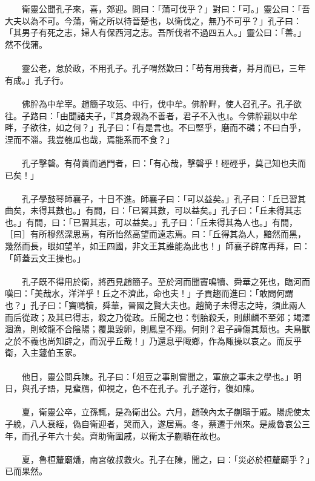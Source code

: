 \\\\
　　衛靈公聞孔子來，喜，郊迎。問曰：「蒲可伐乎？」對曰：「可。」靈公曰：「吾大夫以為不可。今蒲，衛之所以待晉楚也，以衛伐之，無乃不可乎？」孔子曰：「其男子有死之志，婦人有保西河之志。吾所伐者不過四五人。」靈公曰：「善。」然不伐蒲。
\\\\
　　靈公老，怠於政，不用孔子。孔子喟然歎曰：「苟有用我者，朞月而已，三年有成。」孔子行。
\\\\
　　佛肸為中牟宰。趙簡子攻范、中行，伐中牟。佛肸畔，使人召孔子。孔子欲往。子路曰：「由聞諸夫子，『其身親為不善者，君子不入也』。今佛肸親以中牟畔，子欲往，如之何？」孔子曰：「有是言也。不曰堅乎，磨而不磷；不曰白乎，涅而不淄。我豈匏瓜也哉，焉能系而不食？」
\\\\
　　孔子擊磬。有荷蕢而過門者，曰：「有心哉，擊磬乎！硜硜乎，莫己知也夫而已矣！」
\\\\
　　孔子學鼓琴師襄子，十日不進。師襄子曰：「可以益矣。」孔子曰：「丘已習其曲矣，未得其數也。」有間，曰：「已習其數，可以益矣。」孔子曰：「丘未得其志也。」有間，曰：「已習其志，可以益矣。」孔子曰：「丘未得其為人也。」有間，［曰］有所穆然深思焉，有所怡然高望而遠志焉。曰：「丘得其為人，黯然而黑，幾然而長，眼如望羊，如王四國，非文王其誰能為此也！」師襄子辟席再拜，曰：「師蓋云文王操也。」
\\\\
　　孔子既不得用於衛，將西見趙簡子。至於河而聞竇鳴犢、舜華之死也，臨河而嘆曰：「美哉水，洋洋乎！丘之不濟此，命也夫！」子貢趨而進曰：「敢問何謂也？」孔子曰：「竇鳴犢，舜華，晉國之賢大夫也。趙簡子未得志之時，須此兩人而后從政；及其已得志，殺之乃從政。丘聞之也：刳胎殺夭，則麒麟不至郊；竭澤涸漁，則蛟龍不合陰陽；覆巢毀卵，則鳳皇不翔。何則？君子諱傷其類也。夫鳥獸之於不義也尚知辟之，而況乎丘哉！」乃還息乎陬鄉，作為陬操以哀之。而反乎衛，入主蘧伯玉家。
\\\\
　　他日，靈公問兵陳。孔子曰：「俎豆之事則嘗聞之，軍旅之事未之學也。」明日，與孔子語，見蜚鴈，仰視之，色不在孔子。孔子遂行，復如陳。
\\\\
　　夏，衛靈公卒，立孫輒，是為衛出公。六月，趙鞅內太子蒯聵于戚。陽虎使太子絻，八人衰絰，偽自衛迎者，哭而入，遂居焉。冬，蔡遷于州來。是歲魯哀公三年，而孔子年六十矣。齊助衛圍戚，以衛太子蒯聵在故也。
\\\\
　　夏，魯桓釐廟燔，南宮敬叔救火。孔子在陳，聞之，曰：「災必於桓釐廟乎？」已而果然。

